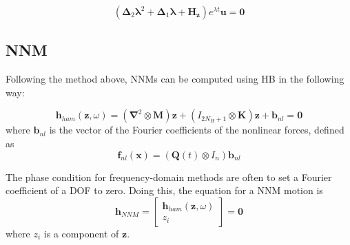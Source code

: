 \begin{equation}
  \left( \bm \Delta_2 \bm \lambda^2 + \bm \Delta_1 \bm \lambda + \bm H_{\bm z}  \right)
  e^{\lambda t} \bm u = \bm 0
\end{equation}


\subsection{NNM}
\label{sec:hb_nnm_appendix}

Following the method above, NNMs can be computed using HB in the following way:

\begin{equation}
  \bm h_{ham} (\bm z, \omega) = (\bm \nabla^2 \otimes \bm M) \bm z +
  (I_{2N_H+1} \otimes \bm K) \bm z + \bm b_{nl} = \bm 0
\end{equation}
where $\bm b_{nl}$ is the vector of the Fourier coefficients of the nonlinear
forces, defined as
\begin{equation}
  \bm f_{nl}(\bm x) = (\bm Q(t)\otimes I_n) \bm b_{nl}
\end{equation}

The phase condition for frequency-domain methods are often to set a Fourier
coefficient of a DOF to zero. Doing this, the equation for a NNM motion is
\begin{equation}
  \label{eq:hb_nnm}
  \bm h_{NNM} =
  \begin{bmatrix}
    \bm h_{ham}(\bm z, \omega) \\ z_i
  \end{bmatrix}
  = \bm 0
\end{equation}
where $z_i$ is a component of $\bm z$.

